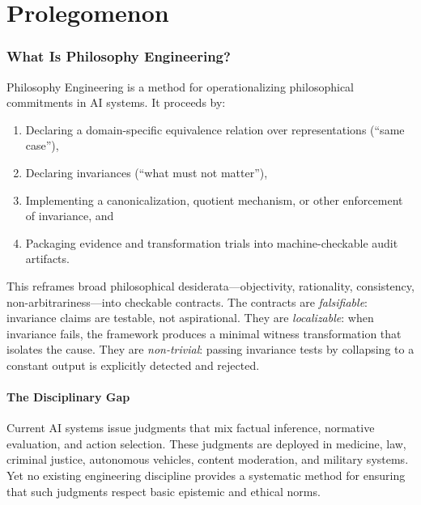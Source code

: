 \documentclass[12pt,letterpaper]{article}
\theoremstyle{definition}
\theoremstyle{plain}
\begin{document}
\newpage
\tableofcontents
\newpage

\part{Prolegomenon}
\label{part:prolegomenon}

\section{What Is Philosophy Engineering?}
\label{sec:what-is-pe}

Philosophy Engineering is a method for operationalizing philosophical commitments in AI systems. It proceeds by:
\begin{enumerate}[label=(\roman*)]
    \item Declaring a domain-specific equivalence relation over representations (``same case''),
    \item Declaring invariances (``what must not matter''),
    \item Implementing a canonicalization, quotient mechanism, or other enforcement of invariance, and
    \item Packaging evidence and transformation trials into machine-checkable audit artifacts.
\end{enumerate}

This reframes broad philosophical desiderata---objectivity, rationality, consistency, non-arbitrariness---into checkable contracts. The contracts are \emph{falsifiable}: invariance claims are testable, not aspirational. They are \emph{localizable}: when invariance fails, the framework produces a minimal witness transformation that isolates the cause. They are \emph{non-trivial}: passing invariance tests by collapsing to a constant output is explicitly detected and rejected.

\subsection{The Disciplinary Gap}

Current AI systems issue judgments that mix factual inference, normative evaluation, and action selection. These judgments are deployed in medicine, law, criminal justice, autonomous vehicles, content moderation, and military systems. Yet no existing engineering discipline provides a systematic method for ensuring that such judgments respect basic epistemic and ethical norms.
\end{document}
